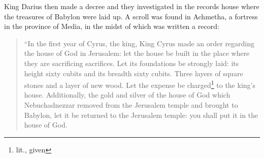 
\begin{inparaenum}
     King Darius then made a decree and they investigated in the records house where the treasures of Babylon were laid up.%
     A scroll was found in Achmetha, a fortress in the province of Media, in the midst of which was written a record:%
\end{inparaenum}
\begin{quotation}
    \begin{inparaenum}\setcounter{enumi}{2}
         ``In the first year of Cyrus, the king, King Cyrus made an order regarding the house of God in Jerusalem: let the house be built in the place where they are sacrificing sacrifices. Let its foundations be strongly laid: its height sixty cubits and its breadth sixty cubits.%
         Three layers of square stones and a layer of new wood. Let the expense be charged\footnote{lit., given} to the king's house.%
         Additionally, the gold and silver of the house of God which Nebuchadnezzar removed from the Jerusalem temple and brought to Babylon, let it be returned to the Jerusalem temple: you shall put it in the house of God.%
        

\end{inparaenum}
\end{quotation}
